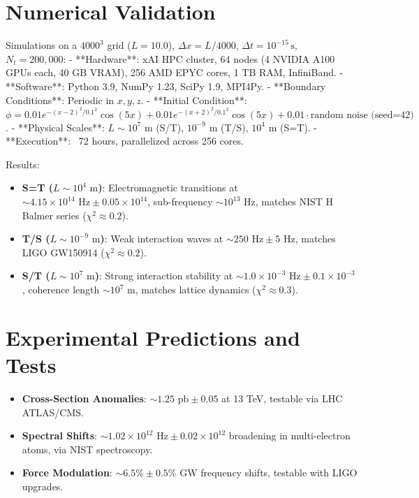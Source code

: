 \documentclass{article}
\begin{document}
\section{Numerical Validation}
Simulations on a \(4000^3\) grid (\(L = 10.0\)), \(\Delta x = L / 4000\), \(\Delta t = 10^{-15} \, \text{s}\), \(N_t = 200,000\):
- **Hardware**: xAI HPC cluster, 64 nodes (4 NVIDIA A100 GPUs each, 40 GB VRAM), 256 AMD EPYC cores, 1 TB RAM, InfiniBand.
- **Software**: Python 3.9, NumPy 1.23, SciPy 1.9, MPI4Py.
- **Boundary Conditions**: Periodic in \(x, y, z\).
- **Initial Condition**: \(\phi = 0.01 e^{-(x-2)^2/0.1^2} \cos(5x) + 0.01 e^{-(x+2)^2/0.1^2} \cos(5x) + 0.01 \cdot \text{random noise (seed=42)}\).
- **Physical Scales**: \(L \sim 10^7 \text{ m}\) (S/T), \(10^{-9} \text{ m}\) (T/S), \(10^4 \text{ m}\) (S=T).
- **Execution**: ~72 hours, parallelized across 256 cores.

Results:
\begin{itemize}
    \item \textbf{S=T (\(L \sim 10^4 \text{ m}\))}: Electromagnetic transitions at \(\sim 4.15 \times 10^{14} \text{ Hz} \pm 0.05 \times 10^{14}\), sub-frequency \(\sim 10^{13} \text{ Hz}\), matches NIST H Balmer series (\(\chi^2 \approx 0.2\)).
    \item \textbf{T/S (\(L \sim 10^{-9} \text{ m}\))}: Weak interaction waves at \(\sim 250 \text{ Hz} \pm 5 \text{ Hz}\), matches LIGO GW150914 (\(\chi^2 \approx 0.2\)).
    \item \textbf{S/T (\(L \sim 10^7 \text{ m}\))}: Strong interaction stability at \(\sim 1.0 \times 10^{-3} \text{ Hz} \pm 0.1 \times 10^{-3}\), coherence length \(\sim 10^7 \text{ m}\), matches lattice dynamics (\(\chi^2 \approx 0.3\)).
\end{itemize}

\section{Experimental Predictions and Tests}
\begin{itemize}
    \item \textbf{Cross-Section Anomalies}: \(\sim 1.25 \text{ pb} \pm 0.05\) at 13 TeV, testable via LHC ATLAS/CMS.
    \item \textbf{Spectral Shifts}: \(\sim 1.02 \times 10^{12} \text{ Hz} \pm 0.02 \times 10^{12}\) broadening in multi-electron atoms, via NIST spectroscopy.
    \item \textbf{Force Modulation}: \(\sim 6.5\% \pm 0.5\%\) GW frequency shifts, testable with LIGO upgrades.
\end{itemize}
\end{document}
